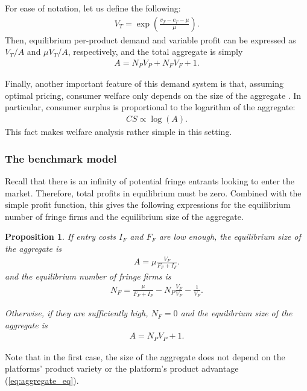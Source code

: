 \documentclass[a4paper]{article}
\newtheorem{proposition}{Proposition}
\begin{document}
For ease of notation, let us define the following:
\begin{align*}
    V_T = \exp \left( \frac{v_T - c_T - \mu}{\mu} \right).
\end{align*}
Then, equilibrium per-product demand and variable profit can be expressed as $V_T/ A$ and $\mu V_T/ A$, respectively, and the total aggregate is simply
\begin{align*}
    A = N_P V_P + N_F V_F + 1.
\end{align*}

Finally, another important feature of this demand system is that, assuming optimal pricing, consumer welfare only depends on the size of the aggregate \parencite{anderson2020aggregative}.
In particular, consumer surplus is proportional to the logarithm of the aggregate:
\begin{align*}
    CS \propto \log(A).
\end{align*}
This fact makes welfare analysis rather simple in this setting.

\subsubsection{The benchmark model}

Recall that there is an infinity of potential fringe entrants looking to enter the market.
Therefore, total profits in equilibrium must be zero.
Combined with the simple profit function, this gives the following expressions for the equilibrium number of fringe firms and the equilibrium size of the aggregate.
\begin{proposition}
    If entry costs $I_F$ and $F_F$ are low enough, the equilibrium size of the aggregate is
    \begin{align}
        A = \mu \frac{V_F}{F_F + I_F}.
        \label{eq:aggregate_eq}
    \end{align}
    and the equilibrium number of fringe firms is
    \begin{align*}
        N_F = \frac{\mu}{F_F + I_F} - N_P \frac{V_P}{V_F} - \frac{1}{V_F}.
    \end{align*}

    Otherwise, if they are sufficiently high, $N_F = 0$ and the equilibrium size of the aggregate is
    \begin{align*}
        A = N_P V_P + 1.
    \end{align*}
\end{proposition}
Note that in the first case, the size of the aggregate does not depend on the platforms' product variety or the platform's product advantage (\cref{eq:aggregate_eq}).
\end{document}
